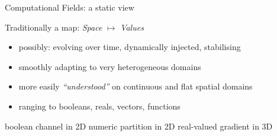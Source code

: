 \documentclass[presentation, 8pt]{beamer}\mode<presentation>{\usetheme{AMSBolognaFC}}
\begin{document}
\begin{frame}[fragile]{Computational Fields: a static view}
	\begin{alertblock}{Traditionally a map: \textit{Space} $\mapsto$ \textit{Values}}
		\begin{itemize}
			\item possibly: evolving over time, dynamically injected, stabilising
			\item smoothly adapting to very heterogeneous domains
			\item more easily \emph{``understood''} on continuous and flat spatial domains
			\item ranging to booleans, reals, vectors, functions
		\end{itemize}
	\end{alertblock}
	\vfill
	\begin{multicols}{3}
		{ boolean channel in 2D}
		{ numeric partition in 2D}
		{ real-valued gradient in 3D}
	\end{multicols}
\end{frame}
\end{document}

